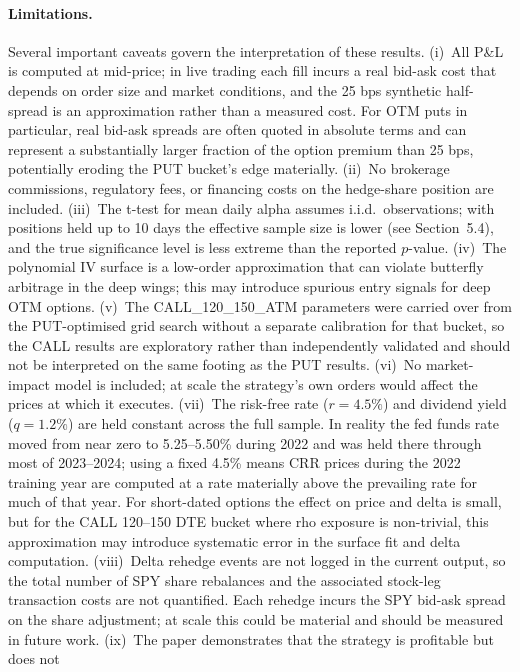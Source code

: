 \documentclass[10pt,twocolumn]{article}
\begin{document}
\paragraph{Limitations.}
Several important caveats govern the interpretation of these results.
(i)~All P\&L is computed at mid-price; in live trading each fill
incurs a real bid-ask cost that depends on order size and market conditions,
and the 25 bps synthetic half-spread is an approximation rather than
a measured cost.  For OTM puts in particular, real bid-ask spreads are often
quoted in absolute terms and can represent a substantially larger fraction of
the option premium than 25 bps, potentially eroding the PUT bucket's edge
materially.  (ii)~No brokerage commissions, regulatory fees, or
financing costs on the hedge-share position are included.  (iii)~The
t-test for mean daily alpha assumes i.i.d.\ observations; with positions
held up to 10 days the effective sample size is lower (see Section~5.4),
and the true significance level is less extreme than the reported $p$-value.
(iv)~The polynomial IV surface is a low-order approximation that can violate
butterfly arbitrage in the deep wings; this may introduce spurious entry
signals for deep OTM options.  (v)~The CALL\_120\_150\_ATM parameters were
carried over from the PUT-optimised grid search without a separate calibration
for that bucket, so the CALL results are exploratory rather than
independently validated and should not be interpreted on the same footing as
the PUT results.  (vi)~No market-impact model is included; at scale the
strategy's own orders would affect the prices at which it executes.
(vii)~The risk-free rate ($r = 4.5\%$) and dividend yield ($q = 1.2\%$) are
held constant across the full sample.  In reality the fed funds rate moved
from near zero to 5.25--5.50\% during 2022 and was held there through most
of 2023--2024; using a fixed 4.5\% means CRR prices during the 2022 training
year are computed at a rate materially above the prevailing rate for much of
that year.  For short-dated options the effect on price and delta is small,
but for the CALL 120--150 DTE bucket where rho exposure is non-trivial, this
approximation may introduce systematic error in the surface fit and delta
computation.
(viii)~Delta rehedge events are not logged in the current output, so the
total number of SPY share rebalances and the associated stock-leg transaction
costs are not quantified.  Each rehedge incurs the SPY bid-ask spread on
the share adjustment; at scale this could be material and should be measured
in future work.
(ix)~The paper demonstrates that the strategy is profitable but does not
\end{document}
